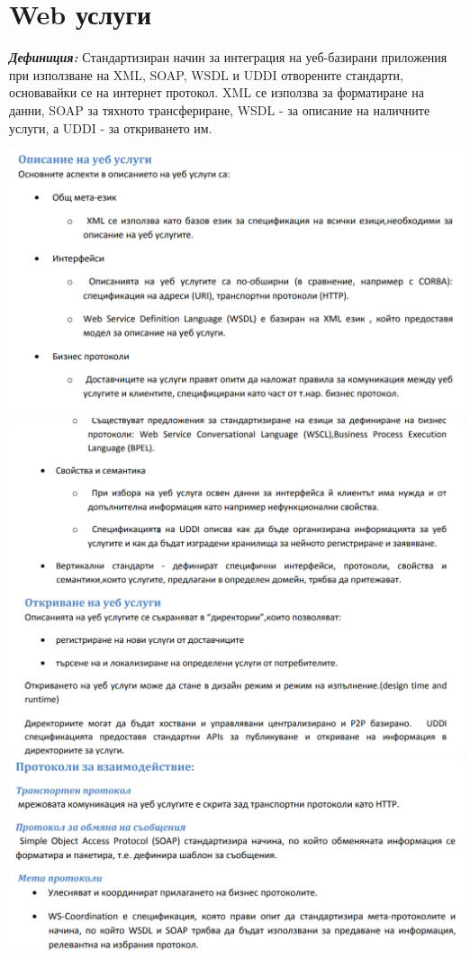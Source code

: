 \documentclass[11pt]{article} %
\newcommand{\italicBold}[1]{\textbf{\emph{#1}}}
\newcommand{\definition}{\italicBold{Дефиниция: }}
\begin{document}
\section{Web услуги}
\definition Стандартизиран начин за интеграция на уеб-базирани приложения при използване на XML, SOAP, WSDL и UDDI отворените стандарти, основавайки се на интернет протокол. XML се използва за форматиране на данни, SOAP за тяхното трансфериране, WSDL - за описание на наличните услуги, а UDDI - за откриването им. 
\begin{center}
	\includegraphics[scale=0.65]{WebServices1.png}
	\includegraphics[scale=0.65]{WebServices2.png}
	\includegraphics[scale=0.65]{WebServices3.png}

\end{center}
\end{document}
